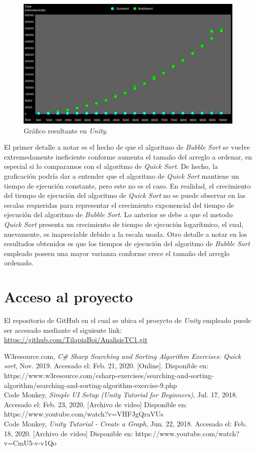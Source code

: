 \documentclass[conference]{IEEEtran}
\begin{document}
\begin{figure}[htbp]
\centerline{\includegraphics[scale=0.34]{grafico.png}}
\caption{Gráfico resultante en \textit{Unity}.}
\label{fig}
\end{figure}

El primer detalle a notar es el hecho de que el algoritmo de \textit{Bubble Sort} se vuelve extremedamente ineficiente conforme
aumenta el tamaño del arreglo a ordenar, en especial si lo comparamos con el algoritmo de \textit{Quick Sort}. De hecho, la graficación
podría dar a entender que el algoritmo de \textit{Quick Sort} mantiene un tiempo de ejecución constante, pero este no es el caso. En realidad,
el crecimiento del tiempo de ejecución del algoritmo de \textit{Quick Sort} no se puede observar en las escalas requeridas para representar
el crecimiento exponencial del tiempo de ejecución del algoritmo de \textit{Bubble Sort}. Lo anterior se debe a que el metodo \textit{Quick Sort}
presenta un crecimiento de tiempo de ejecución logarítmico, el cual, nuevamente, es inapreciable debido a la escala usada.
Otro detalle a notar en los resultados obtenidos es que los tiempos de ejecución del algoritmo de \textit{Bubble Sort} empleado poseen 
una mayor varianza conforme crece el tamaño del arreglo ordenado.

\section{Acceso al proyecto}
El repositorio de GitHub en el cual se ubica el proeycto de \textit{Unity} empleado puede ser accesado mediante el siguiente link: \url{https://github.com/TilapiaBoi/AnalisisTC1.git}

\begin{thebibliography}{00}
 W3resource.com, \textit{C\# Sharp Searching and Sorting Algorithm Exercises: Quick sort}, Nov. 2019. Accesado el: Feb. 21, 2020. [Online]. Disponible en: https://www.w3resource.com/csharp-exercises/searching-and-sorting-algorithm/searching-and-sorting-algorithm-exercise-9.php\\
 Code Monkey, \textit{Simple UI Setup (Unity Tutorial for Beginners)}, Jul. 17, 2018. Accesado el: Feb. 23, 2020. [Archivo de video] Disponible en: https://www.youtube.com/watch?v=VHFJgQraVUs\\
 Code Monkey, \textit{Unity Tutorial - Create a Graph}, Jun. 22, 2018. Accesado el: Feb. 18, 2020. [Archivo de video] Disponible en: https://www.youtube.com/watch?v=CmU5-v-v1Qo
\end{thebibliography}
\end{document}
